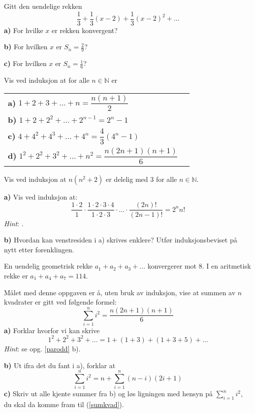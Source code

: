 Gitt den uendelige rekken
\[\frac{1}{3} +\frac{1}{3}(x-2)+ \frac{1}{3}(x-2)^2+\ldots\]
\textbf{a)} For hvilke $ x $ er rekken konvergent? \os

\textbf{b)} For hvilken $ x $ er $ S_n = \frac{2}{9} $?\os

\textbf{c)} For hvilken $ x $ er $ S_n= \frac{1}{6}$? \os

\nes
{}
Vis ved induksjon at for alle $ n\in \mathbb{N} $ er\\[10pt]
\begin{tabular}{@{}l l}	
	\textbf{a)} $ 1+2+3+\ldots+n = \dfrac{n(n+1)}{2} $ \\[10pt]
	\textbf{b)} $ 1+2 +2^2 +\ldots+ 2^{n-1}= 2^n-1$\\[10pt]
	\textbf{c)} $ 4+4^2+4^3+\ldots+4^n = \dfrac{4}{3}(4^n-1) $ \\[10pt]
	\textbf{d)} $ 1^2 + 2^2+3^2+ \ldots+ n^2 = \dfrac{n(2n+1)(n+1)}{6} $ 
\end{tabular} 

Vis ved induksjon at $ n(n^2+2) $ er delelig med 3 for alle $ n\in\mathbb{N} $.

\textbf{a)}
Vis ved induksjon at:
\[\frac{1\cdot2}{1}\cdot\frac{1\cdot2\cdot3\cdot4}{1\cdot2\cdot3}\cdot
\ldots\cdot\frac{(2n)!}{(2n-1)!}=2^n n! \]
\textsl{Hint}: .\os

\textbf{b)} Hvordan kan venstresiden i a) skrives enklere? Utfør induksjonsbeviset på nytt etter forenklingen.
\newpage

En uendelig geometrisk rekke $ a_1+a_2+a_3+... $ konvergerer mot 8.
I en aritmetisk rekke er $ a_1+a_4+a_7 =114 $.

Målet med denne oppgaven er å, uten bruk av induksjon, vise at summen av $ n $ kvadrater er gitt ved følgende formel:
\[ \sum\limits_{i=1}^n i^2 = \frac{n(2n+1)(n+1)}{6} \tag{I}\label{sumkvad}\]
\textbf{a)} Forklar hvorfor vi kan skrive
\[ 1^2 + 2^2 + 3^2+\ldots = 1 + (1+3) + (1+3+5)+ \ldots  \]
\textsl{Hint}: se opg. \ref{parodd} b).\os

\textbf{b)} Ut ifra det du fant i a), forklar at
\[ \sum\limits_{i=1}^n i^2 = n+\sum\limits_{i=1}^n (n-i)(2i+1)  \]
\textbf{c)} Skriv ut alle kjente summer fra b) og løs ligningen med hensyn på $ \sum\limits_{i=1}^n i^2 $, du skal da komme fram til (\ref{sumkvad}).




